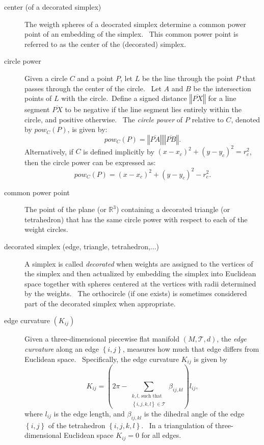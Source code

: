 \begin{description}
\item[center (of a decorated simplex)] The weigth spheres of a deocrated
simplex determine a common power point of an embedding of the simplex. \
This common power point is referred to as the center of the (decorated)
simplex.

\item[circle power] Given a circle $C$ and a point $P$, let $L$ be the line
through the point $P$ that passes through the center of the circle. \ Let $A$
and $B$ be the intersection points of $L$ with the circle.\ Define a signed
distance $\left\Vert \overline{PX}\right\Vert $ for a line segment $%
\overline{PX}$ to be negative if the line segment lies entirely within the
circle, and positive otherwise. \ The \textit{circle power} of $P$ relative
to $C$, denoted by $pow_{C}\left( P\right) $, is given by:%
\[
pow_{C}\left( P\right) =\left\Vert \overline{PA}\right\Vert \left\Vert 
\overline{PB}\right\Vert . 
\]%
Alternatively, if $C$ is defined implicitly by $\left( x-x_{c}\right)
^{2}+\left( y-y_{c}\right) ^{2}=r_{c}^{2}$, then the circle power can be
expressed as:%
\[
pow_{C}\left( P\right) =\left( x-x_{c}\right) ^{2}+\left( y-y_{c}\right)
^{2}-r_{c}^{2}. 
\]

\item[common power point] The point of the plane (or $%
\mathbb{R}
^{3}$) containing a decorated triangle (or tetrahedron) that has the same
circle power with respect to each of the weight circles. \ 

\item[decorated simplex (edge, triangle, tetrahedron,...)] A simplex is
called \textit{decorated} when weights are assigned to the vertices of the
simplex and then actualized by embedding the simplex into Euclidean space
together with spheres centered at the vertices with radii determined by the
weights. \ The orthocircle (if one exists) is sometimes considered part of
the decorated simplex when appropriate.

\item[edge curvature $\left( K_{ij}\right) $] Given a three-dimensional
piecewise flat manifold $\left( M,\mathcal{T},d\right) $, the \textit{edge
curvature} along an edge $\left\{ i,j\right\} $, measures how much that edge
differs from Euclidean space. \ Specifically, the edge curvature $K_{ij}$ is
given by 
\[
K_{ij}=\left( 2\pi -\sum\limits_{\substack{ k,l\text{, such that}  \\ %
\left\{ i,j,k,l\right\} \in \mathcal{T}}}\beta _{ij,kl}\right) l_{ij}, 
\]%
where $l_{ij}$ is the edge length, and $\beta _{ij,kl}$ is the dihedral
angle of the edge $\left\{ i,j\right\} $ of the tetrahedron $\left\{
i,j,k,l\right\} $. \ In a triangulation of three-dimensional Euclidean space 
$K_{ij}=0$ for all edges. \ 


\end{description}
